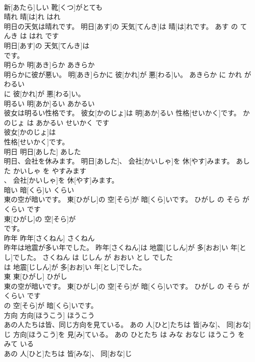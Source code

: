 \documentclass[8pt]{extreport}
\begin{document}
\begin{CJK}{UTF8}{min}
\\	新[あたら]しい 靴[くつ]がとても
\\	晴れ	晴[は]れ	はれ	
\\	明日の天気は晴れです。	明日[あす]の 天気[てんき]は 晴[は]れです。	あす の てんき は はれ です	
\\	明日[あす]の 天気[てんき]は
\\	です。			
\\	明らか	明[あき]らか	あきらか	
\\	明らかに彼が悪い。	明[あき]らかに 彼[かれ]が 悪[わる]い。	あきらか に かれ が わるい	
\\	に 彼[かれ]が 悪[わる]い。			
\\	明るい	明[あか]るい	あかるい	
\\	彼女は明るい性格です。	彼女[かのじょ]は 明[あか]るい 性格[せいかく]です。	かのじょ は あかるい せいかく です	
\\	彼女[かのじょ]は
\\	性格[せいかく]です。			
\\	明日	明日[あした]	あした	
\\	明日、会社を休みます。	明日[あした]、 会社[かいしゃ]を 休[やす]みます。	あした かいしゃ を やすみます	
\\	、 会社[かいしゃ]を 休[やす]みます。			
\\	暗い	暗[くら]い	くらい	
\\	東の空が暗いです。	東[ひがし]の 空[そら]が 暗[くら]いです。	ひがし の そら が くらい です	
\\	東[ひがし]の 空[そら]が
\\	です。			
\\	昨年	昨年[さくねん]	さくねん	
\\	昨年は地震が多い年でした。	昨年[さくねん]は 地震[じしん]が 多[おお]い 年[とし]でした。	さくねん は じしん が おおい とし でした	
\\	は 地震[じしん]が 多[おお]い 年[とし]でした。			
\\	東	東[ひがし]	ひがし	
\\	東の空が暗いです。	東[ひがし]の 空[そら]が 暗[くら]いです。	ひがし の そら が くらい です	
\\	の 空[そら]が 暗[くら]いです。			
\\	方向	方向[ほうこう]	ほうこう	
\\	あの人たちは皆、同じ方向を見ている。	あの 人[ひと]たちは 皆[みな]、 同[おな]じ 方向[ほうこう]を 見[み]ている。	あの ひとたち は みな おなじ ほうこう を みて いる	
\\	あの 人[ひと]たちは 皆[みな]、 同[おな]じ

\end{CJK}
\end{document}
